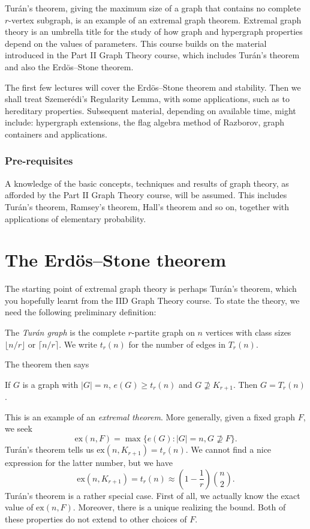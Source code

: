 \documentclass[a4paper]{article}
\renewcommand\ex{\mathrm{ex}}
\begin{document}
\maketitle
{\small
\setlength{\parindent}{0em}
\setlength{\parskip}{1em}
Tur\'an's theorem, giving the maximum size of a graph that contains no complete $r$-vertex subgraph, is an example of an extremal graph theorem. Extremal graph theory is an umbrella title for the study of how graph and hypergraph properties depend on the values of parameters. This course builds on the material introduced in the Part II Graph Theory course, which includes Tur\'an's theorem and also the Erd\"os--Stone theorem.

The first few lectures will cover the Erd\"os--Stone theorem and stability. Then we shall treat Szemer\'edi's Regularity Lemma, with some applications, such as to hereditary properties. Subsequent material, depending on available time, might include: hypergraph extensions, the flag algebra method of Razborov, graph containers and applications.

\subsubsection*{Pre-requisites}
A knowledge of the basic concepts, techniques and results of graph theory, as afforded by the Part II Graph Theory course, will be assumed. This includes Tur\'an's theorem, Ramsey's theorem, Hall's theorem and so on, together with applications of elementary probability.
}
\tableofcontents

\section{The \texorpdfstring{Erd\"os--Stone}{Erdos--Stone} theorem}
The starting point of extremal graph theory is perhaps Tur\'an's theorem, which you hopefully learnt from the IID Graph Theory course. To state the theory, we need the following preliminary definition:
\begin{defi}
  The \emph{Tur\'an graph}  is the complete $r$-partite graph on $n$ vertices with class sizes $\lfloor n/r\rfloor$ or $\lceil n/r\rceil$. We write $t_r(n)$ for the number of edges in $T_r(n)$.
\end{defi}

The theorem then says
\begin{thm}
  If $G$ is a graph with $|G| = n$, $e(G) \geq t_r(n)$ and $G \not \supseteq K_{r+1}$. Then $G = T_r(n)$.
\end{thm}
This is an example of an \emph{extremal theorem}. More generally, given a fixed graph $F$, we seek
\[
  \ex(n, F) = \max \{e(G): |G| = n, G \not\supseteq F\}.
\]
Tur\'an's theorem tells us $\ex(n, K_{r + 1}) = t_r(n)$. We cannot find a nice expression for the latter number, but we have
\[
  \ex(n, K_{r + 1}) = t_r(n) \approx \left(1 - \frac{1}{r}\right)\binom{n}{2}.
\]
Tur\'an's theorem is a rather special case. First of all, we actually know the exact value of $\ex(n, F)$. Moreover, there is a unique  realizing the bound. Both of these properties do not extend to other choices of $F$.
\end{document}

